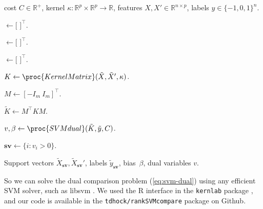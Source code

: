 \documentclass{article}
\newcommand{\SVMcompare}{SVMcompare}
\newcommand{\RR}{\mathbb R}
\begin{document}
\begin{algorithm}[b!]
   \caption{\SVMcompare}
   \label{alg:SVMcompare}
\begin{algorithmic}
   cost $C\in\RR^+$, kernel
  $\kappa:\RR^p\times \RR^p \rightarrow \RR$, features $X,X'\in\RR^{n \times p}$,
  labels $y\in\{-1,0,1\}^n$.

  \STATE {} $\gets [$
  $]^\intercal$.

  \STATE {} $\gets [$
  $]^\intercal$.

  \STATE {} $\gets [$
  $]^\intercal$.

  \STATE $K \gets \proc{KernelMatrix}(\tilde X, \tilde X', \kappa)$.

  \STATE $M \gets [ -I_m\ I_m ]^\intercal$.

  \STATE $\tilde K \gets M^\intercal K M$.

  \STATE $v,\beta \gets \proc{SVMdual}(\tilde K, \tilde y, C)$.



  \STATE $\textbf{sv}\gets\{i: v_i>0\}$.
  
   Support vectors $\tilde
  X_{\textbf{sv}},\tilde X_{\textbf{sv}}'$, labels $\tilde y_{\textbf{sv}}$,
  bias~$\beta$, dual variables $v$.

   \end{algorithmic}
\end{algorithm}

So we can solve the dual comparison problem (\ref{eq:svm-dual}) using
any efficient SVM solver, such as libsvm \citep{libsvm}. We used the R
interface in the \texttt{kernlab} package \cite{kernlab}, and our
code is available in the \texttt{tdhock/rankSVMcompare} package on Github.
\end{document}
